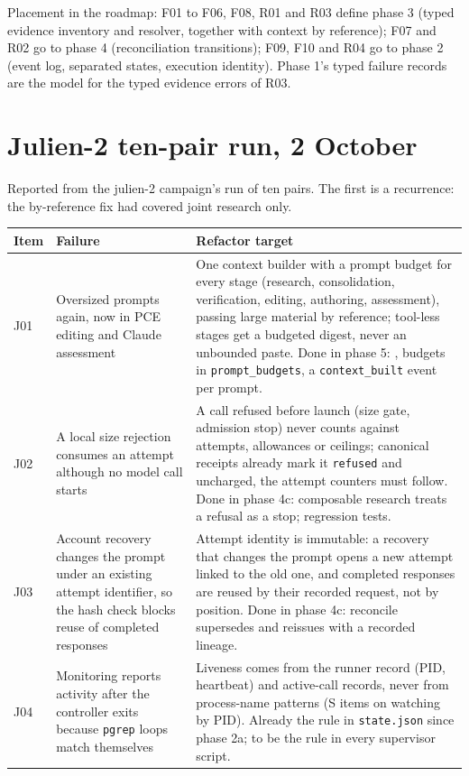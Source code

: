 \documentclass[11pt,a4paper]{article}
\begin{document}
Placement in the roadmap: F01 to F06, F08, R01 and R03 define phase 3 (typed
evidence inventory and resolver, together with context by reference); F07 and R02
go to phase 4 (reconciliation transitions); F09, F10 and R04 go to phase 2 (event
log, separated states, execution identity). Phase 1's typed failure records are
the model for the typed evidence errors of R03.

\section{Julien-2 ten-pair run, 2 October}\label{sec:julien-2oct}

Reported from the julien-2 campaign's run of ten pairs. The first is a recurrence: the
by-reference fix had covered joint research only.

{\footnotesize\setlength{\tabcolsep}{3pt}\renewcommand{\arraystretch}{1.15}
\begin{xltabular}{\linewidth}{L{8mm}L{56mm}Y}
\toprule Item & Failure & Refactor target\\\midrule\endhead
\bottomrule\endfoot
J01 & Oversized prompts again, now in PCE editing and Claude assessment & One context builder with a prompt budget for every stage (research, consolidation, verification, editing, authoring, assessment), passing large material by reference; tool-less stages get a budgeted digest, never an unbounded paste. Done in phase 5: , budgets in \texttt{prompt\_budgets}, a \texttt{context\_built} event per prompt.\\
J02 & A local size rejection consumes an attempt although no model call starts & A call refused before launch (size gate, admission stop) never counts against attempts, allowances or ceilings; canonical receipts already mark it \texttt{refused} and uncharged, the attempt counters must follow. Done in phase 4c: composable research treats a refusal as a stop; regression tests.\\
J03 & Account recovery changes the prompt under an existing attempt identifier, so the hash check blocks reuse of completed responses & Attempt identity is immutable: a recovery that changes the prompt opens a new attempt linked to the old one, and completed responses are reused by their recorded request, not by position. Done in phase 4c: reconcile supersedes and reissues with a recorded lineage.\\
J04 & Monitoring reports activity after the controller exits because \texttt{pgrep} loops match themselves & Liveness comes from the runner record (PID, heartbeat) and active-call records, never from process-name patterns (S items on watching by PID). Already the rule in \texttt{state.json} since phase 2a; to be the rule in every supervisor script.\\

\end{xltabular}}
\end{document}
